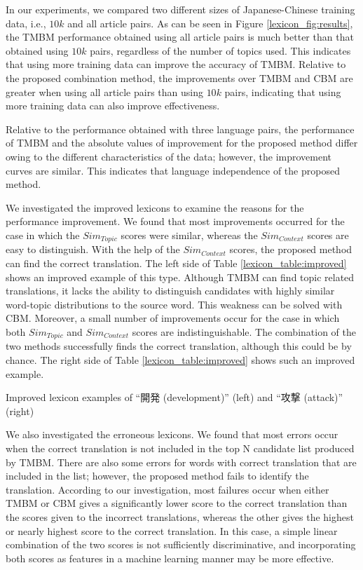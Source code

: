 \documentclass[english]{jnlp_1.4}
\begin{document}
In our experiments, we compared two different sizes of Japanese-Chinese training data, 
i.e., $10k$ and all article pairs. As can be seen in Figure \ref{lexicon_fig:results}, the TMBM performance obtained 
using all article pairs is much better than that obtained using $10k$ pairs, regardless of the 
number of topics used. This indicates that using more training data can improve the accuracy 
of TMBM. Relative to the proposed combination method, the improvements over TMBM and CBM are 
greater when using all article pairs than using $10k$ pairs, indicating that using more training 
data can also improve effectiveness.

Relative to the performance obtained with three language pairs, the performance of 
TMBM and the absolute values of improvement for the proposed method differ owing to 
the different characteristics of the data; however, the improvement curves are similar. 
This indicates that language independence of the proposed method.

We investigated the improved lexicons to examine the reasons for the performance improvement. 
We found that most improvements occurred for the case in which the $Sim_{Topic}$ scores were similar, 
whereas the $Sim_{Context}$ scores are easy to distinguish. With the help of the $Sim_{Context}$ scores, 
the proposed method can find the correct translation. The left side of Table \ref{lexicon_table:improved} shows an improved 
example of this type. Although TMBM can find topic related translations, it lacks the ability to 
distinguish candidates with highly similar word-topic distributions to the source word. This 
weakness can be solved with CBM. Moreover, a small number of improvements occur for the case 
in which both $Sim_{Topic}$ and $Sim_{Context}$ scores are indistinguishable. The combination of the 
two methods successfully finds the correct translation, although this could be by chance. 
The right side of Table \ref{lexicon_table:improved} shows such an improved example.

\begin{table}[b]
\caption{Improved lexicon examples of ``開発 (development)'' (left) and ``攻撃 (attack)'' (right)}
\label{lexicon_table:improved}

\end{table}

We also investigated the erroneous lexicons. We found that most errors occur when the 
correct translation is not included in the top N candidate list produced by TMBM.
There are also some errors for words with correct translation that are included in the list; 
however, the proposed method fails to identify the translation. According to our investigation, 
most failures occur when either TMBM or CBM gives a significantly lower score to the correct 
translation than the scores given to the incorrect translations, whereas the other gives the 
highest or nearly highest score to the correct translation. In this case, a simple linear 
combination of the two scores is not sufficiently discriminative, and incorporating both 
scores as features in a machine learning manner may be more effective.
\end{document}
